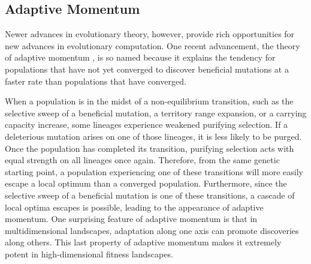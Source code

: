 \subsection{Adaptive Momentum}
\label{sec:adaptive-momentum}


Newer advances in evolutionary theory, however, provide rich opportunities for new advances in evolutionary computation.
One recent advancement, the theory of adaptive momentum \citep{bohm2024reduced}, is so named because it explains the tendency for populations that have not yet converged to discover beneficial mutations at a faster rate than populations that have converged.

When a population is in the midst of a non-equilibrium transition, such as the selective sweep of a beneficial mutation, a territory range expansion, or a carrying capacity increase, some lineages experience weakened purifying selection.
If a deleterious mutation arises on one of those lineages, it is less likely to be purged.
Once the population has completed its transition, purifying selection acts with equal strength on all lineages once again.
Therefore, from the same genetic starting point, a population experiencing one of these transitions will more easily escape a local optimum than a converged population.
Furthermore, since the selective sweep of a beneficial mutation is one of these transitions, a cascade of local optima escapes is possible, leading to the appearance of adaptive momentum.
One surprising feature of adaptive momentum is that in multidimensional landscapes, adaptation along one axis can promote discoveries along others.
This last property of adaptive momentum makes it extremely potent in high-dimensional fitness landscapes.
